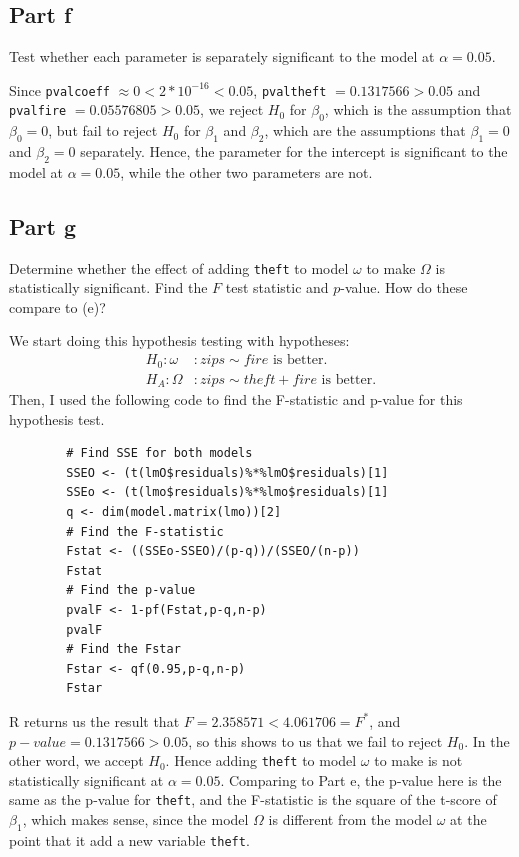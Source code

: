 \subsection{Part f}

\begin{question}
    Test whether each parameter is separately significant to the model at $\alpha = 0.05$.
\end{question}

\begin{answer}
    Since \verb+pvalcoeff+ $\approx 0 < 2*10^{-16} < 0.05$, \verb+pvaltheft+ $= 0.1317566 > 0.05 $ and \verb+pvalfire+ $= 0.05576805 > 0.05$, we reject $H_0$ for $\beta_0$, which is the assumption that $\beta_0 = 0$, but fail to reject $H_0$ for $\beta_1$ and $\beta_2$, which are the assumptions that $\beta_1 = 0$ and $\beta_2 = 0$ separately. Hence, the parameter for the intercept is significant to the model at $\alpha = 0.05$, while the other two parameters are not.
\end{answer}

\subsection{Part g}

\begin{question}
    Determine whether the effect of adding \verb+theft+ to model $\omega$ to make $\Omega$ is statistically significant. Find the $F$ test statistic and $p$-value. How do these compare to (e)?
\end{question}

\begin{answer}
    We start doing this hypothesis testing with hypotheses:
    \begin{align}
        H_0: \omega &: zips \sim fire \text{ is better.}\\
        H_A: \Omega &: zips \sim theft + fire \text{ is better.}
    \end{align}
    Then, I used the following code to find the F-statistic and p-value for this hypothesis test.
    \begin{verbatim}
        # Find SSE for both models
        SSEO <- (t(lmO$residuals)%*%lmO$residuals)[1]
        SSEo <- (t(lmo$residuals)%*%lmo$residuals)[1]
        q <- dim(model.matrix(lmo))[2]
        # Find the F-statistic
        Fstat <- ((SSEo-SSEO)/(p-q))/(SSEO/(n-p))
        Fstat
        # Find the p-value
        pvalF <- 1-pf(Fstat,p-q,n-p)
        pvalF
        # Find the Fstar
        Fstar <- qf(0.95,p-q,n-p)
        Fstar
    \end{verbatim}
    R returns us  the result that $F = 2.358571 < 4.061706 = F^{*}$, and $p-value = 0.1317566 > 0.05$, so this shows to us that we fail to reject $H_0$. In the other word, we accept $H_0$. Hence adding \verb+theft+ to model $\omega$ to make is not statistically significant at $\alpha = 0.05$. Comparing to Part e, the p-value here is the same as the p-value for \verb+theft+, and the F-statistic is the square of the t-score of $\beta_1$, which makes sense, since the model $\Omega$ is different from the model $\omega$ at the point that it add a new variable \verb+theft+.
    \end{answer}

